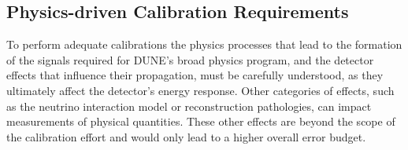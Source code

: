 
 

\subsection{Physics-driven Calibration Requirements}
\label{sec:phys-calib-req}

To perform adequate calibrations the physics processes that lead to the formation of the signals required for DUNE's broad physics program, and the detector effects that influence their propagation, must be carefully understood, as they ultimately affect the detector's energy response. 
Other categories of effects, such as the neutrino interaction model or reconstruction pathologies, can impact measurements of physical quantities. These other effects are beyond the scope of the  calibration effort and would only lead to a higher overall error budget.

